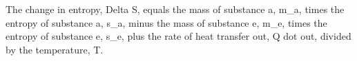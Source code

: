 The change in entropy, Delta S, equals the mass of substance a, m_a, times the entropy of substance a, s_a, minus the mass of substance e, m_e, times the entropy of substance e, s_e, plus the rate of heat transfer out, Q dot out, divided by the temperature, T.